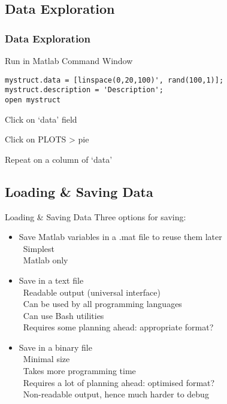 \documentclass[]{beamer} %
\begin{document}
\subsection{Data Exploration}
\begin{frame}[fragile]
\frametitle{Data Exploration}
\begin{block}{Run in Matlab Command Window}
\vspace{-3.5mm}
\begin{verbatim}mystruct.data = [linspace(0,20,100)', rand(100,1)];
mystruct.description = 'Description';
open mystruct\end{verbatim}
\end{block}
%
\begin{block}{Click on `data' field}
\end{block}
%
\begin{block}{Click on PLOTS > pie}
\end{block}
%
\begin{block}{Repeat on a column of `data'}
\end{block}
\end{frame}


\subsection{Loading \& Saving Data}
\begin{frame}{Loading \& Saving Data}\centering
Three options for saving: 
\begin{itemize}
\item Save Matlab variables in a .mat file to reuse them later \\
	\cg\, Simplest\\\ccr\, Matlab only
\item Save in a text file\\
	\cg\, Readable output (universal interface)\\
	\cg\, Can be used by all programming languages \\
	\cg\, Can use Bash utilities \\
	\ccr\, Requires some planning ahead: appropriate format?
\item Save in a binary file\\
	\cg\, Minimal size\\
	\ccr\, Takes more programming time\\
	\ccr\, Requires a lot of planning ahead: optimised format?\\
	\ccr\, Non-readable output, hence much harder to debug
\end{itemize}
\end{frame}
\end{document}
